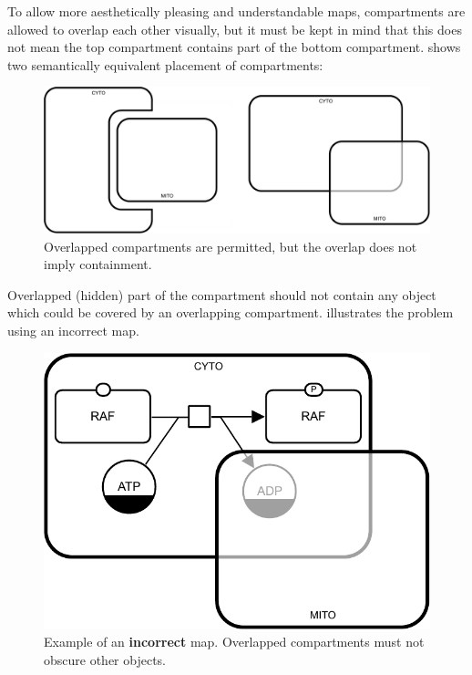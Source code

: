 To allow more aesthetically pleasing and understandable maps, compartments are allowed to overlap each other visually, but it must be kept in mind that this does not mean the top compartment contains part of the bottom compartment.   shows two semantically equivalent placement of compartments:

\begin{figure}[htb]
  \centering
  \includegraphics[scale = 0.4]{examples/compartment_overlapping}
  \caption{Overlapped compartments are permitted, but the overlap does not imply containment.}
  \label{fig:techref:overlap}
\end{figure}

Overlapped (hidden) part of the compartment should not contain any object which could be covered by an overlapping compartment.   illustrates the problem using an incorrect map.

\begin{figure}[htb]
  \centering
  \includegraphics[scale = 0.45]{examples/compartment_overlapping_wrong}
  \caption{Example of an \textbf{incorrect} map.  Overlapped compartments must not obscure other objects.}
  \label{fig:techref:overlap-bad}
\end{figure}


